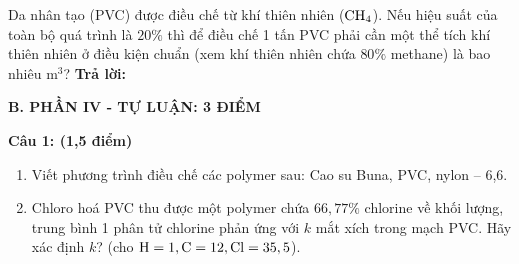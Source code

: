 \documentclass[11pt,a4paper]{article}
\begin{document}
\begin{ex}
Da nhân tạo (PVC) được điều chế từ khí thiên nhiên ($\ce{CH4}$). Nếu hiệu suất của toàn bộ quá trình là $20\%$ thì để điều chế 1 tấn PVC phải cần một thể tích khí thiên nhiên ở điều kiện chuẩn (xem khí thiên nhiên chứa $80\%$ methane) là bao nhiêu $\text{m}^3$?
\hfill \textbf{Trả lời:} \dotfill

\end{ex}
\vspace{4pt}
\noindent
{\color{mainGreen}\textbf{\Large B. PHẦN IV - TỰ LUẬN: 3 ĐIỂM}}
\vspace{3pt}

\noindent
\textbf{Câu 1: (1,5 điểm)}
\begin{enumerate}[label=\alph*),leftmargin=20pt,itemsep=2pt]
\item Viết phương trình điều chế các polymer sau: Cao su Buna, PVC, nylon -- 6,6.
\item Chloro hoá PVC thu được một polymer chứa $66,77\%$ chlorine về khối lượng, trung bình 1 phân tử chlorine phản ứng với $k$ mắt xích trong mạch PVC. Hãy xác định $k$? (cho $\ce{H}=1, \ce{C}=12, \ce{Cl}=35,5$).
\end{enumerate}
\end{document}
